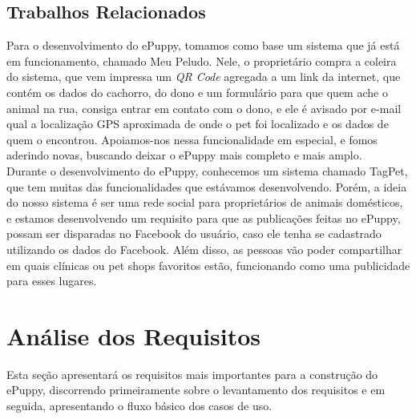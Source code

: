 \subsection{Trabalhos Relacionados}
Para o desenvolvimento do ePuppy, tomamos como base um sistema que já está em funcionamento, chamado Meu Peludo. Nele, o proprietário compra a coleira do sistema, que vem impressa um {\it QR Code} agregada a um link da internet, que contém os dados do cachorro, do dono e um formulário para que quem ache o animal na rua, consiga entrar em contato com o dono, e ele é avisado por e-mail qual a localização GPS aproximada de onde o pet foi localizado e os dados de quem o encontrou. Apoiamos-nos nessa funcionalidade em especial, e fomos aderindo novas, buscando deixar o ePuppy mais completo e mais amplo.
\\
\indent
Durante o desenvolvimento do ePuppy, conhecemos um sistema chamado TagPet, que tem muitas das funcionalidades que estávamos desenvolvendo. Porém, a ideia do nosso sistema é ser uma rede social para proprietários de animais domésticos, e estamos desenvolvendo um requisito para que as publicações feitas no ePuppy, possam ser disparadas no Facebook do usuário, caso ele tenha se cadastrado utilizando os dados do Facebook. Além disso, as pessoas vão poder compartilhar em quais clínicas ou pet shops favoritos estão, funcionando como uma publicidade para esses lugares.


\section{Análise dos Requisitos}
Esta seção apresentará os requisitos mais importantes para a construção do ePuppy, discorrendo primeiramente sobre o levantamento dos requisitos e em seguida, apresentando o fluxo básico dos casos de uso.


